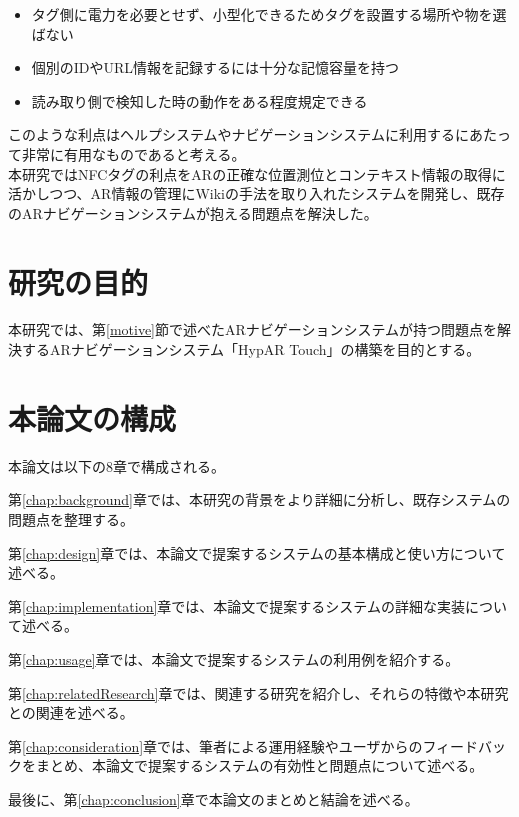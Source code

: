 \begin{itemize}
  \item タグ側に電力を必要とせず、小型化できるためタグを設置する場所や物を選ばない
  \item 個別のIDやURL情報を記録するには十分な記憶容量を持つ
  \item 読み取り側で検知した時の動作をある程度規定できる
\end{itemize}

このような利点はヘルプシステムやナビゲーションシステムに利用するにあたって非常に有用なものであると考える。
\\
本研究ではNFCタグの利点をARの正確な位置測位とコンテキスト情報の取得に活かしつつ、AR情報の管理にWikiの手法を取り入れたシステムを開発し、既存のARナビゲーションシステムが抱える問題点を解決した。

\section{研究の目的}
本研究では、第\ref{motive}節で述べたARナビゲーションシステムが持つ問題点を解決するARナビゲーションシステム「HypAR Touch」の構築を目的とする。


\section{本論文の構成}

本論文は以下の8章で構成される。

第\ref{chap:background}章では、本研究の背景をより詳細に分析し、既存システムの問題点を整理する。

第\ref{chap:design}章では、本論文で提案するシステムの基本構成と使い方について述べる。

第\ref{chap:implementation}章では、本論文で提案するシステムの詳細な実装について述べる。

第\ref{chap:usage}章では、本論文で提案するシステムの利用例を紹介する。

第\ref{chap:relatedResearch}章では、関連する研究を紹介し、それらの特徴や本研究との関連を述べる。

第\ref{chap:consideration}章では、筆者による運用経験やユーザからのフィードバックをまとめ、本論文で提案するシステムの有効性と問題点について述べる。

最後に、第\ref{chap:conclusion}章で本論文のまとめと結論を述べる。